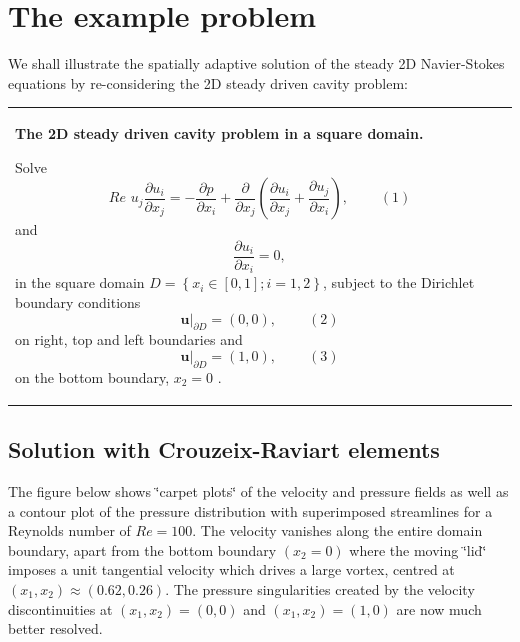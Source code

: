  

\hypertarget{index_example}{}\section{The example problem}\label{index_example}
We shall illustrate the spatially adaptive solution of the steady 2D Navier-\/\+Stokes equations by re-\/considering the 2D steady driven cavity problem\+:

\begin{center} \tabulinesep=1mm
\begin{longtabu} spread 0pt [c]{*{1}{|X[-1]}|}
\hline
\begin{center} {\bfseries The 2D steady driven cavity problem in a square domain.} \end{center}  Solve \[ Re\phantom{i}u_j\frac{\partial u_i}{\partial x_j} = - \frac{\partial p}{\partial x_i} + \frac{\partial }{\partial x_j} \left( \frac{\partial u_i}{\partial x_j} + \frac{\partial u_j}{\partial x_i} \right), \ \ \ \ \ \ \ \ \ \ (1) \] and \[ \frac{\partial u_i}{\partial x_i} = 0, \] in the square domain $ D = \left\{x_i \in [0,1]; i=1,2 \right\} $, subject to the Dirichlet boundary conditions \[ \left. \mathbf{u}\right|_{\partial D}=(0,0), \ \ \ \ \ \ \ \ \ \ (2) \] on right, top and left boundaries and \[ \left. \mathbf{u}\right|_{\partial D}=(1,0), \ \ \ \ \ \ \ \ \ \ (3) \] on the bottom boundary, $ x_2 = 0 $ .   \\
\end{longtabu}
\end{center} 



\hypertarget{index_CR}{}\subsection{Solution with Crouzeix-\/\+Raviart elements}\label{index_CR}
The figure below shows \char`\"{}carpet plots\char`\"{} of the velocity and pressure fields as well as a contour plot of the pressure distribution with superimposed streamlines for a Reynolds number of $ Re=100$. The velocity vanishes along the entire domain boundary, apart from the bottom boundary $ (x_2 = 0) $ where the moving \char`\"{}lid\char`\"{} imposes a unit tangential velocity which drives a large vortex, centred at $ (x_1,x_2) \approx (0.62,0.26)$. The pressure singularities created by the velocity discontinuities at $ (x_1,x_2)=(0,0) $ and $ (x_1,x_2)=(1,0) $ are now much better resolved.

